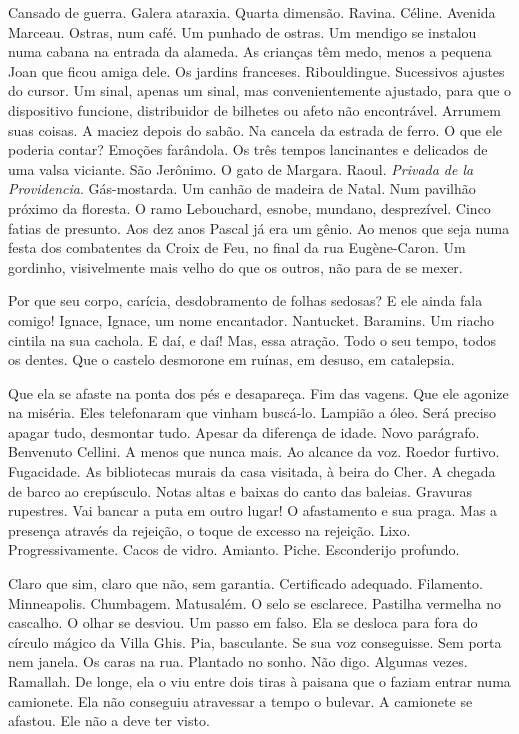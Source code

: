Cansado de guerra. Galera ataraxia. Quarta dimensão. Ravina. Céline.
Avenida Marceau. Ostras, num café. Um punhado de ostras. Um mendigo se
instalou numa cabana na entrada da alameda. As crianças têm medo, menos
a pequena Joan que ficou amiga dele. Os jardins franceses. Ribouldingue.
Sucessivos ajustes do cursor. Um sinal, apenas um sinal, mas
convenientemente ajustado, para que o dispositivo funcione, distribuidor
de bilhetes ou afeto não encontrável. Arrumem suas coisas. A maciez
depois do sabão. Na cancela da estrada de ferro. O que ele poderia
contar? Emoções farândola. Os três tempos lancinantes e delicados de uma
valsa viciante. São Jerônimo. O gato de Margara. Raoul. \emph{Privada de
la Providencia}. Gás-mostarda. Um canhão de madeira de Natal. Num
pavilhão próximo da floresta. O ramo Lebouchard, esnobe, mundano,
desprezível. Cinco fatias de presunto. Aos dez anos Pascal já era um
gênio. Ao menos que seja numa festa dos combatentes da Croix de Feu, no
final da rua Eugène-Caron. Um gordinho, visivelmente mais velho do que
os outros, não para de se mexer.

Por que seu corpo, carícia, desdobramento de folhas sedosas? E ele ainda
fala comigo! Ignace, Ignace, um nome encantador. Nantucket. Baramins. Um
riacho cintila na sua cachola. E daí, e daí! Mas, essa atração. Todo o
seu tempo, todos os dentes. Que o castelo desmorone em ruínas, em
desuso, em catalepsia.

Que ela se afaste na ponta dos pés e desapareça. Fim das vagens. Que ele
agonize na miséria. Eles telefonaram que vinham buscá-lo. Lampião a
óleo. Será preciso apagar tudo, desmontar tudo. Apesar da diferença de
idade. Novo parágrafo. Benvenuto Cellini. A menos que nunca mais. Ao
alcance da voz. Roedor furtivo. Fugacidade. As bibliotecas murais da
casa visitada, à beira do Cher. A chegada de barco ao crepúsculo. Notas
altas e baixas do canto das baleias. Gravuras rupestres. Vai bancar a
puta em outro lugar! O afastamento e sua praga. Mas a presença através
da rejeição, o toque de excesso na rejeição. Lixo. Progressivamente.
Cacos de vidro. Amianto. Piche. Esconderijo profundo.

Claro que sim, claro que não, sem garantia. Certificado adequado.
Filamento. Minneapolis. Chumbagem. Matusalém. O selo se esclarece.
Pastilha vermelha no cascalho. O olhar se desviou. Um passo em falso.
Ela se desloca para fora do círculo mágico da Villa Ghis. Pia,
basculante. Se sua voz conseguisse. Sem porta nem janela. Os caras na
rua. Plantado no sonho. Não digo. Algumas vezes. Ramallah. De longe, ela
o viu entre dois tiras à paisana que o faziam entrar numa camionete. Ela
não conseguiu atravessar a tempo o bulevar. A camionete se afastou. Ele
não a deve ter visto.

